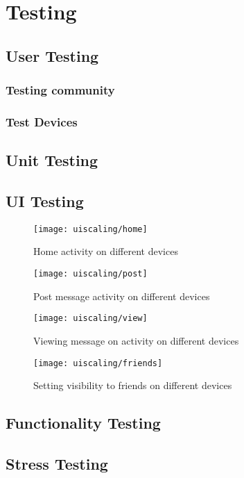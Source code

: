 \chapter{Testing}

\section{User Testing}

\subsection{Testing community}

\subsection{Test Devices}


\section{Unit Testing}

\section{UI Testing}

\begin{figure}[h]
    \centering
    \texttt{[image: uiscaling/home]}
    \caption{Home activity on different devices}
    \label{fig:ui_scaling_home_image}
\end{figure} 
\noindent

\begin{figure}[h]
    \centering
    \texttt{[image: uiscaling/post]}
    \caption{Post message activity on different devices}
    \label{fig:ui_scaling_post_image}
\end{figure} 
\noindent

\begin{figure}[h]
    \centering
    \texttt{[image: uiscaling/view]}
    \caption{Viewing message on activity on different devices}
    \label{fig:ui_scaling_view_image}
\end{figure} 
\noindent

\begin{figure}[h]
    \centering
    \texttt{[image: uiscaling/friends]}
    \caption{Setting visibility to friends on different devices}
    \label{fig:ui_scaling_friends_image}
\end{figure} 
\noindent

\section{Functionality Testing}

\section{Stress Testing}

